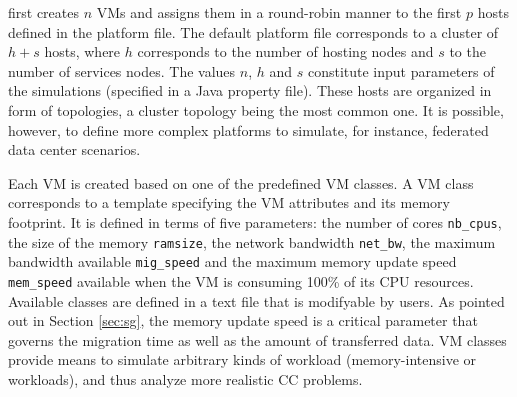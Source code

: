 \vmps first creates $n$ VMs and assigns them in a round-robin manner
to the first $p$ hosts defined in the platform file.  The default
platform file corresponds to a cluster of $h+s$ hosts, where $h$
corresponds to the number of hosting nodes and $s$ to the number of
services nodes. The values $n$, $h$ and $s$ constitute input
parameters of the simulations (specified in a Java property file).
These hosts are organized in form of topologies, a cluster topology
being the most common one. It is possible, however, to define more
complex platforms to simulate, for instance, federated data center scenarios.

Each VM is created based on one of the predefined VM classes. A VM
class corresponds to a template specifying the VM attributes and its
memory footprint. It is
defined in terms of five parameters: the number of cores
\texttt{nb\_cpus}, the size of the memory \texttt{ramsize}, the
network bandwidth \texttt{net\_bw}, the maximum bandwidth available
\texttt{mig\_speed} and the maximum memory update speed
\texttt{mem\_speed} available when the VM is consuming 100\% of its
CPU resources.  Available classes are defined in a text file that is
modifyable by users.  As pointed out in Section \ref{sec:sg}, the
memory update speed is a critical parameter that governs the migration
time as well as the amount of transferred data.  VM classes provide
means to simulate arbitrary kinds of workload (\eg memory-intensive or
workloads), and thus analyze more realistic CC problems.

